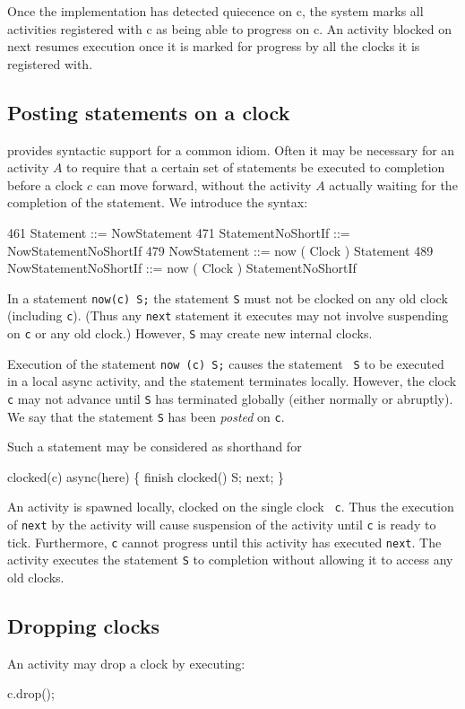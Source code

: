 Once the implementation has detected quiecence on {\cf c}, the system
marks all activities registered with {\cf c} as being able to progress
on {\cf c}. An activity blocked on {\cf next} resumes execution once
it is marked for progress by all the clocks it is registered with.


\subsection{Posting statements on a clock}
\Xten{} provides syntactic support for a common idiom. Often it may be
necessary for an activity $A$ to require that a certain set of
statements be executed to completion before a clock $c$ can move
forward, without the activity $A$ actually waiting for the completion
of the statement. We introduce the syntax:
\begin{x10}
461 Statement ::= NowStatement
471 StatementNoShortIf ::= NowStatementNoShortIf
479 NowStatement ::= now ( Clock ) Statement
489 NowStatementNoShortIf ::= now ( Clock ) StatementNoShortIf
\end{x10}
\noindent 
In a statement {\tt now(c) S;} the statement {\tt S} must not be
clocked on any old clock (including {\tt c}). (Thus any {\tt next}
statement it executes may not involve suspending on {\tt c} or
any old clock.) However, {\tt S} may create new internal clocks.

Execution of the statement {\tt now (c) S;} causes the statement {\tt
S} to be executed in a local async activity, and the statement
terminates locally. However, the clock {\tt c} may not advance until
{\tt S} has terminated globally (either normally or abruptly). We say
that the statement {\tt S} has been {\em posted} on {\tt c}.

Such a statement may be considered as shorthand for
\begin{x10}
  clocked(c) async(here) \{ 
     finish clocked() S; 
     next;
  \}
\end{x10}
An activity is spawned locally, clocked on the single clock {\tt
c}. Thus the execution of {\tt next} by the activity will cause
suspension of the activity until {\tt c} is ready to
tick. Furthermore, {\tt c} cannot progress until this activity has
executed {\tt next}. The activity executes the statement {\tt S} to
completion without allowing it to access any old clocks.

\subsection{Dropping clocks}
An activity may drop a clock by executing:
\begin{x10}
c.drop();
\end{x10}

